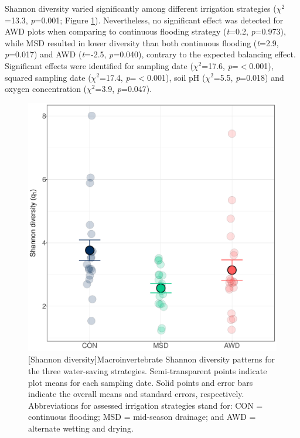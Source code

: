 Shannon diversity varied significantly among different irrigation strategies ($\chi^2$=13.3, \textit{p}=0.001; Figure \ref{Div_q1}). Nevertheless, no significant effect was detected for AWD plots when comparing to continuous flooding strategy (\textit{t}=0.2, \textit{p}=0.973), while MSD resulted in lower diversity than both continuous flooding (\textit{t}=2.9, \textit{p}=0.017) and AWD (\textit{t}=-2.5, \textit{p}=0.040), contrary to the expected balancing effect. Significant effects were identified for sampling date ($\chi^2$=17.6, \textit{p}=$<$0.001), squared sampling date ($\chi^2$=17.4, \textit{p}=$<$0.001), soil pH ($\chi^2$=5.5, \textit{p}=0.018) and oxygen concentration ($\chi^2$=3.9, \textit{p}=0.047).

 \begin{figure} [ht]
\captionsetup{justification=justified}
	\centering 
	\includegraphics[scale=0.33, center]{Figures/Chapter_1/Shannon_indiv2.pdf}
	[Shannon diversity]{Macroinvertebrate Shannon diversity patterns for the three water-saving strategies. Semi-transparent points indicate plot means for each sampling date. Solid points and error bars indicate the overall means and standard errors, respectively. Abbreviations for assessed irrigation strategies stand for: CON = continuous flooding; MSD = mid-season drainage; and AWD = alternate wetting and drying.}   
	\label{Div_q1}
\end{figure}

